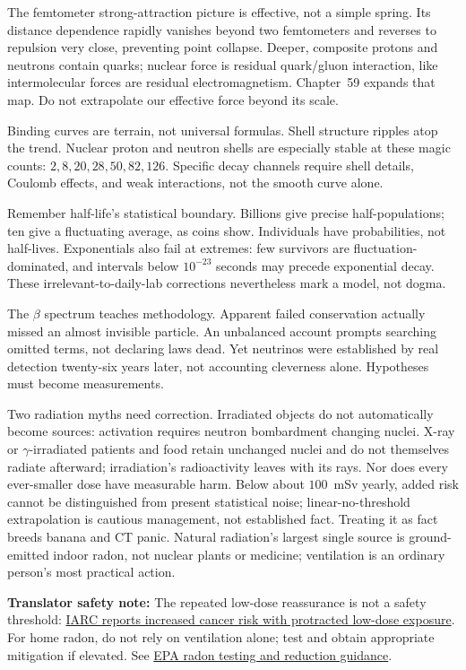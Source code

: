 
The femtometer strong-attraction picture is effective, not a simple spring. Its distance dependence rapidly vanishes beyond two femtometers and reverses to repulsion very close, preventing point collapse. Deeper, composite protons and neutrons contain quarks; nuclear force is residual quark/gluon interaction, like intermolecular forces are residual electromagnetism. Chapter~59 expands that map. Do not extrapolate our effective force beyond its scale.

Binding curves are terrain, not universal formulas. Shell structure ripples atop the trend. Nuclear proton and neutron shells are especially stable at these magic counts: \(2,8,20,28,50,82,126\). Specific decay channels require shell details, Coulomb effects, and weak interactions, not the smooth curve alone.

Remember half-life's statistical boundary. Billions give precise half-populations; ten give a fluctuating average, as coins show. Individuals have probabilities, not half-lives. Exponentials also fail at extremes: few survivors are fluctuation-dominated, and intervals below \(10^{-23}\) seconds may precede exponential decay. These irrelevant-to-daily-lab corrections nevertheless mark a model, not dogma.

The \(\beta\) spectrum teaches methodology. Apparent failed conservation actually missed an almost invisible particle. An unbalanced account prompts searching omitted terms, not declaring laws dead. Yet neutrinos were established by real detection twenty-six years later, not accounting cleverness alone. Hypotheses must become measurements.

Two radiation myths need correction. Irradiated objects do not automatically become sources: activation requires neutron bombardment changing nuclei. X-ray or \(\gamma\)-irradiated patients and food retain unchanged nuclei and do not themselves radiate afterward; irradiation's radioactivity leaves with its rays. Nor does every ever-smaller dose have measurable harm. Below about \(100\)~mSv yearly, added risk cannot be distinguished from present statistical noise; linear-no-threshold extrapolation is cautious management, not established fact. Treating it as fact breeds banana and CT panic. Natural radiation's largest single source is ground-emitted indoor radon, not nuclear plants or medicine; ventilation is an ordinary person's most practical action.

\textbf{Translator safety note:} The repeated low-dose reassurance is not a safety threshold: \href{https://www.iarc.who.int/pressrelease/low-doses-of-ionizing-radiation-increase-risk-of-death-from-solid-cancers/}{IARC reports increased cancer risk with protracted low-dose exposure}. For home radon, do not rely on ventilation alone; test and obtain appropriate mitigation if elevated. See \href{https://www.epa.gov/radtown/radon-homes-schools-and-buildings}{EPA radon testing and reduction guidance}.

